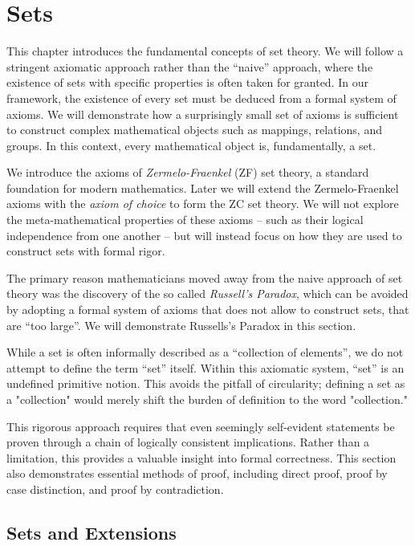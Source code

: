 \section{Sets}

This chapter introduces the fundamental concepts of set theory. We will follow a stringent axiomatic approach rather than the \enquote{naive} approach, where the existence of sets with specific properties is often taken for granted. In our framework, the existence of every set must be deduced from a formal system of axioms. We will demonstrate how a surprisingly small set of axioms is sufficient to construct complex mathematical objects such as mappings, relations, and groups. In this context, every mathematical object is, fundamentally, a set.

We introduce the axioms of \emph{Zermelo-Fraenkel} (ZF) set theory, a standard foundation for modern mathematics. Later we will extend the Zermelo-Fraenkel axioms with the \emph{axiom of choice} to form the ZC set theory. We will not explore the meta-mathematical properties of these axioms -- such as their logical independence from one another -- but will instead focus on how they are used to construct sets with formal rigor.

The primary reason mathematicians moved away from the naive approach of set theory was the discovery of the so called \emph{Russell's Paradox}, which can be avoided by adopting a formal system of axioms that does not allow to construct sets, that are \enquote{too large}. We will demonstrate Russells's Paradox in this section.

While a set is often informally described as a \enquote{collection of elements}, we do not attempt to define the term \enquote{set} itself. Within this axiomatic system, \enquote{set} is an undefined primitive notion. This avoids the pitfall of circularity; defining a set as a "collection" would merely shift the burden of definition to the word "collection."

This rigorous approach requires that even seemingly self-evident statements be proven through a chain of logically consistent implications. Rather than a limitation, this provides a valuable insight into formal correctness. This section also demonstrates essential methods of proof, including direct proof, proof by case distinction, and proof by contradiction.

\subsection{Sets and Extensions}

